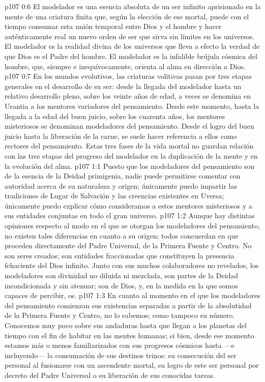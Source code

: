 \vs p107 0:6 El modelador es una esencia absoluta de un ser infinito aprisionado en la mente de una criatura finita que, según la elección de ese mortal, puede con el tiempo consumar esta unión temporal entre Dios y el hombre y hacer auténticamente real un nuevo orden de ser que sirva sin límites en los universos. El modelador es la realidad divina de los universos que lleva a efecto la verdad de que Dios es el Padre del hombre. El modelador es la infalible brújula cósmica del hombre, que, siempre e inequívocamente, orienta al alma en dirección a Dios.
\vs p107 0:7 \pc En los mundos evolutivos, las criaturas volitivas pasan por tres etapas generales en el desarrollo de su ser: desde la llegada del modelador hasta un relativo desarrollo pleno, sobre los veinte años de edad, a veces se denomina en Urantia a los mentores variadores del pensamiento. Desde este momento, hasta la llegada a la edad del buen juicio, sobre los cuarenta años, los mentores misteriosos se denominan modeladores del pensamiento. Desde el logro del buen juicio hasta la liberación de la carne, se suele hacer referencia a ellos como rectores del pensamiento. Estas tres fases de la vida mortal no guardan relación con las tres etapas del progreso del modelador en la duplicación de la mente y en la evolución del alma.
\vs p107 1:1 Puesto que los modeladores del pensamiento son de la esencia de la Deidad primigenia, nadie puede permitirse comentar con autoridad acerca de su naturaleza y origen; únicamente puedo impartir las tradiciones de Lugar de Salvación y las creencias existentes en Uversa; únicamente puedo explicar cómo consideramos a estos mentores misteriosos y a sus entidades conjuntas en todo el gran universo.
\vs p107 1:2 Aunque hay distintas opiniones respecto al modo en el que se otorgan los modeladores del pensamiento, no existen tales diferencias en cuanto a su origen; todos concuerdan en que proceden directamente del Padre Universal, de la Primera Fuente y Centro. No son seres creados; son entidades fraccionadas que constituyen la presencia fehaciente del Dios infinito. Junto con sus muchos colaboradores no revelados, los modeladores son divinidad no diluida ni mezclada, son partes de la Deidad incondicionada y sin atenuar; son de Dios, y, en la medida en la que somos capaces de percibir, os.
\vs p107 1:3 En cuanto al momento en el que los modeladores del pensamiento comienzan sus existencias separadas a partir de la absolutidad de la Primera Fuente y Centro, no lo sabemos; como tampoco su número. Conocemos muy poco sobre sus andaduras hasta que llegan a los planetas del tiempo con el fin de habitar en las mentes humanas; si bien, desde ese momento estamos más o menos familiarizados con sus progresos cósmicos hasta ---e incluyendo--- la consumación de sus destinos trinos: su consecución del ser personal al fusionarse con un ascendente mortal, su logro de este ser personal por decreto del Padre Universal o su liberación de sus conocidas tareas.
